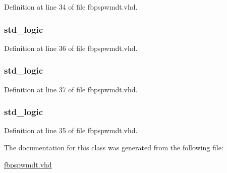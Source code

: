Definition at line 34 of file fbpspwmdt.\+vhd.

\hypertarget{classfbpspwmdt_1_1fbpspwmdt__arch_a5b5410422331d47dda25071eab458071}{}
\subsubsection[{comp\+\_\+out}]{ {\bfseries \textcolor{comment}{std\+\_\+logic}\textcolor{vhdlchar}{ }} \hspace{0.3cm}{\ttfamily [Signal]}}\label{classfbpspwmdt_1_1fbpspwmdt__arch_a5b5410422331d47dda25071eab458071}


Definition at line 36 of file fbpspwmdt.\+vhd.

\hypertarget{classfbpspwmdt_1_1fbpspwmdt__arch_af7e8a49d46795da5945dc6b1f0602c13}{}
\subsubsection[{p\+\_\+\+Pwm\+\_\+\+In}]{ {\bfseries \textcolor{comment}{std\+\_\+logic}\textcolor{vhdlchar}{ }} \hspace{0.3cm}{\ttfamily [Signal]}}\label{classfbpspwmdt_1_1fbpspwmdt__arch_af7e8a49d46795da5945dc6b1f0602c13}


Definition at line 37 of file fbpspwmdt.\+vhd.

\hypertarget{classfbpspwmdt_1_1fbpspwmdt__arch_a90c7671dbb1af7d80f90cd96262cda3b}{}
\subsubsection[{sig\+\_\+\+Not\+\_\+\+Pwm\+\_\+\+In}]{ {\bfseries \textcolor{comment}{std\+\_\+logic}\textcolor{vhdlchar}{ }} \hspace{0.3cm}{\ttfamily [Signal]}}\label{classfbpspwmdt_1_1fbpspwmdt__arch_a90c7671dbb1af7d80f90cd96262cda3b}


Definition at line 35 of file fbpspwmdt.\+vhd.



The documentation for this class was generated from the following file\+:\begin{DoxyCompactItemize}
\item 
\hyperlink{fbpspwmdt_8vhd}{fbpspwmdt.\+vhd}\end{DoxyCompactItemize}
